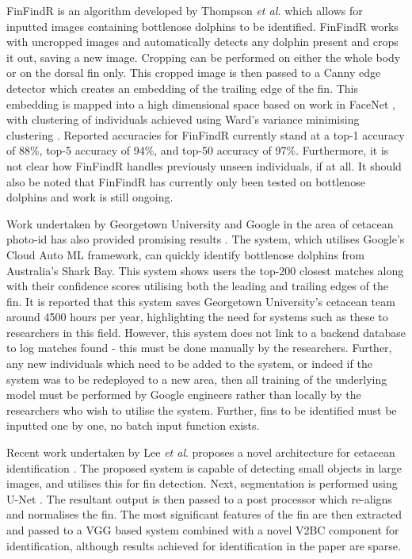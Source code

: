 FinFindR is an algorithm developed by Thompson \textit{et al.} \cite{thompson_finfindr_2022} which allows for inputted images containing bottlenose dolphins to be identified. FinFindR works with uncropped images and automatically detects any dolphin present and crops it out, saving a new image. Cropping can be performed on either the whole body or on the dorsal fin only. This cropped image is then passed to a Canny edge detector which creates an embedding of the trailing edge of the fin. This embedding is mapped into a high dimensional space based on work in FaceNet \cite{schroff_facenet_2015}, with clustering of individuals achieved using Ward's variance minimising clustering \cite{ward_hierarchical_1963}. Reported accuracies for FinFindR currently stand at a top-1 accuracy of 88\%, top-5 accuracy of 94\%, and top-50 accuracy of 97\%. Furthermore, it is not clear how FinFindR handles previously unseen individuals, if at all. It should also be noted that FinFindR has currently only been tested on bottlenose dolphins and work is still ongoing.


Work undertaken by Georgetown University and Google in the area of cetacean photo-id has also provided promising results \cite{mann_dolphin_2019, georgetown_university_is_2018, liang_googles_2018}. The system, which utilises Google's Cloud Auto ML framework, can quickly identify bottlenose dolphins from Australia's Shark Bay. This system shows users the top-200 closest matches along with their confidence scores utilising both the leading and trailing edges of the fin. It is reported that this system saves Georgetown University's cetacean team around 4500 hours per year, highlighting the need for systems such as these to researchers in this field. However, this system does not link to a backend database to log matches found - this must be done manually by the researchers. Further, any new individuals which need to be added to the system, or indeed if the system was to be redeployed to a new area, then all training of the underlying model must be performed by Google engineers rather than locally by the researchers who wish to utilise the system. Further, fins to be identified must be inputted one by one, no batch input function exists.  

Recent work undertaken by Lee \textit{et al}. proposes a novel architecture for cetacean identification \cite{lee_backbone_2020}. The proposed system is capable of detecting small objects in large images, and utilises this for fin detection. Next, segmentation is performed using U-Net \cite{ronneberger_u-net_2015}. The resultant output is then passed to a post processor which re-aligns and normalises the fin. The most significant features of the fin are then extracted and passed to a VGG based system \cite{simonyan_very_2015} combined with a novel V2BC component for identification, although results achieved for identification in the paper are sparse.

